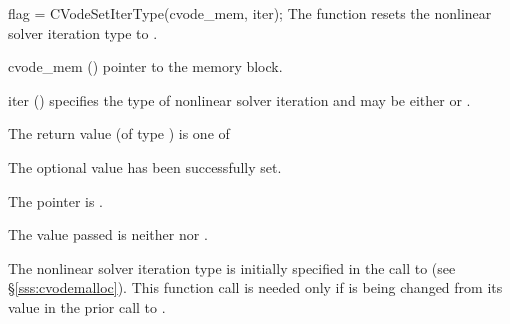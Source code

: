{
flag = CVodeSetIterType(cvode\_mem, iter);
}
{
  The function  resets the nonlinear solver
  iteration type to .
}
{
  \begin{args}
  \item[cvode\_mem] ()
    pointer to the {\cvode} memory block.
  \item[iter] ()
    specifies the type of nonlinear solver iteration and may be
    either  or . 
  \end{args}
}
{
  The return value  (of type ) is one of
  \begin{args}
  \item[\Id{CV\_SUCCESS}] 
    The optional value has been successfully set.
  \item[\Id{CV\_MEM\_NULL}]
    The  pointer is .
  \item[\Id{CV\_ILL\_INPUT}]
    The  value passed is neither  nor .
  \end{args}
}
{
  The nonlinear solver iteration type is initially specified in the call
  to  (see \S\ref{sss:cvodemalloc}). This function call is
  needed only if  is being changed from its value in the prior call 
  to .
}


